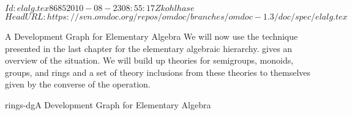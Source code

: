 \svnInfo $Id: elalg.tex 8685 2010-08-23 08:55:17Z kohlhase $
\svnKeyword $HeadURL: https://svn.omdoc.org/repos/omdoc/branches/omdoc-1.3/doc/spec/elalg.tex $

\begin{tchapter}[id=dg-elal]{A Development Graph for Elementary Algebra}
  We will now use the technique presented in the last chapter for the elementary algebraic
  hierarchy. {} gives an overview of the situation. We will build up
  theories for semigroups, monoids, groups, and rings and a set of theory inclusions from
  these theories to themselves given by the converse of the operation.

\begin{myfig}{rings-dg}{A Development Graph for Elementary Algebra}
\end{myfig}
\end{tchapter}
